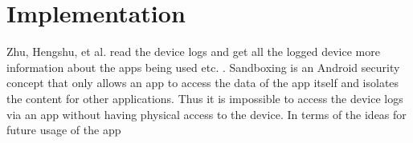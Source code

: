 \chapter{Implementation}

\begin{flushleft}


Zhu, Hengshu, et al. \cite{zhu2015mining} read the device logs and get all the logged device more information about the apps being used etc. .
Sandboxing is an Android security concept that only allows an app to access the data of the app itself and isolates the content for other applications. Thus it is impossible to access the device logs via an app without having physical access to the device. 
In terms of the ideas for future usage of the app 


\end{flushleft}
